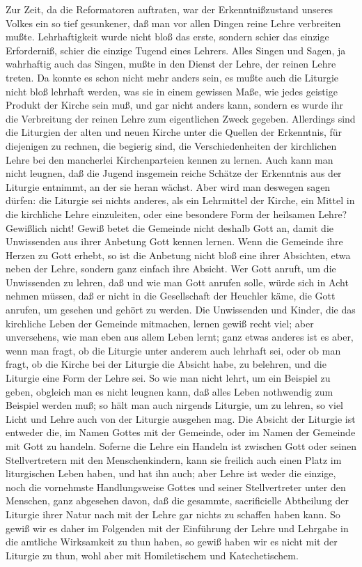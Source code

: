 Zur Zeit, da die Reformatoren auftraten, war der Erkenntnißzustand unseres Volkes ein so tief gesunkener, daß man vor allen Dingen reine Lehre verbreiten mußte. Lehrhaftigkeit wurde nicht bloß das erste, sondern schier das einzige Erforderniß, schier die einzige Tugend eines Lehrers. Alles
Singen und Sagen, ja wahrhaftig auch das Singen, mußte in den Dienst der Lehre, der reinen Lehre treten. Da konnte es schon nicht mehr anders sein, es mußte auch die Liturgie nicht bloß lehrhaft werden, was sie in einem gewissen Maße, wie jedes geistige Produkt der Kirche sein muß, und gar nicht anders kann, sondern es wurde ihr die Verbreitung der reinen Lehre zum eigentlichen Zweck gegeben. Allerdings sind die Liturgien der alten und neuen Kirche unter die Quellen der Erkenntnis, für diejenigen zu rechnen, die begierig sind, die Verschiedenheiten der kirchlichen Lehre bei den mancherlei Kirchenparteien kennen zu lernen. Auch kann man nicht leugnen, daß die Jugend insgemein reiche Schätze der Erkenntnis aus der Liturgie entnimmt, an der sie heran wächst. Aber wird man deswegen sagen dürfen: die Liturgie sei nichts anderes, als ein Lehrmittel der Kirche, ein Mittel in die kirchliche Lehre einzuleiten, oder eine besondere Form der heilsamen Lehre? Gewißlich nicht! Gewiß betet die Gemeinde nicht deshalb Gott an, damit die Unwissenden aus ihrer Anbetung Gott kennen lernen. Wenn die Gemeinde ihre Herzen zu Gott erhebt, so ist die Anbetung nicht bloß eine ihrer Absichten, etwa neben der Lehre, sondern ganz einfach ihre Absicht. Wer Gott anruft, um die Unwissenden zu lehren, daß und wie man Gott anrufen solle, würde sich in Acht nehmen müssen, daß er nicht in die Gesellschaft der Heuchler käme, die Gott anrufen, um gesehen und gehört zu werden. Die Unwissenden und Kinder, die das kirchliche Leben der Gemeinde mitmachen, lernen gewiß recht viel; aber unversehens, wie man eben aus allem Leben
lernt; ganz etwas anderes ist es aber, wenn man fragt, ob die Liturgie unter anderem auch lehrhaft sei, oder ob man fragt, ob die Kirche bei der Liturgie die Absicht habe, zu belehren, und die Liturgie eine Form der Lehre sei. So wie man nicht lehrt, um ein Beispiel zu geben, obgleich man es nicht leugnen kann, daß alles Leben nothwendig zum Beispiel werden muß; so hält man auch nirgends Liturgie, um zu lehren, so viel Licht und Lehre auch von der Liturgie ausgehen mag. Die Absicht der Liturgie ist entweder die, im Namen Gottes mit der Gemeinde, oder im Namen der Gemeinde mit Gott zu handeln. Soferne die Lehre ein Handeln ist zwischen Gott oder seinen Stellvertretern mit den Menschenkindern, kann sie freilich auch einen Platz im liturgischen Leben haben, und hat ihn auch; aber Lehre ist weder die einzige, noch die vornehmste Handlungsweise Gottes und seiner Stellvertreter unter den Menschen, ganz abgesehen davon, daß die gesammte, sacrificielle Abtheilung der Liturgie ihrer Natur nach mit der Lehre gar nichts zu schaffen haben kann. So gewiß wir es daher im Folgenden mit der Einführung der Lehre und Lehrgabe in die amtliche Wirksamkeit zu thun haben, so gewiß haben wir es nicht mit der Liturgie zu thun, wohl aber mit Homiletischem und Katechetischem.

